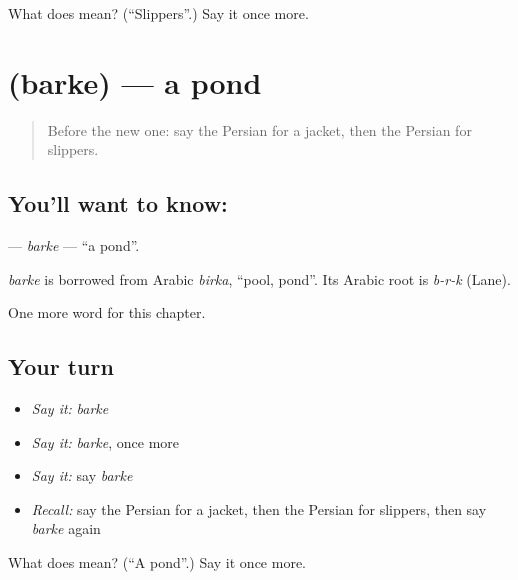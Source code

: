 \begin{tcolorbox}[breakable,colback=teal!4,colframe=teal!35!black,title={Before you move on}]
What does  mean? (\textquotedblleft{}Slippers\textquotedblright{}.) Say it once more.
\end{tcolorbox}
\section[\texorpdfstring{\fa{برکه} (barke)}{برکه (barke)}]{ (barke) — a pond}

\label{lesson:FA-C120-barke}



\begin{quote}
Before the new one: say the Persian for a jacket, then the Persian for slippers.
\end{quote}

\subsection*{You'll want to know: }
\textbf{} — \emph{barke} — \textquotedblleft{}a pond\textquotedblright{}.

\begin{cousinweb}
\emph{barke} is borrowed from Arabic \emph{birka}, \textquotedblleft{}pool, pond\textquotedblright{}. Its Arabic root is \emph{b-r-k} (Lane).
\end{cousinweb}

\begin{grammarlens}[title={What you've built}]
One more word for this chapter.
\end{grammarlens}

\subsection*{Your turn}
\begin{itemize}
\raggedright
  \item \emph{Say it:} \emph{barke}
  \item \emph{Say it:} \emph{barke}, once more
  \item \emph{Say it:} say \emph{barke}
  \item \emph{Recall:} say the Persian for a jacket, then the Persian for slippers, then say \emph{barke} again
\end{itemize}

\begin{tcolorbox}[breakable,colback=teal!4,colframe=teal!35!black,title={Before you move on}]
What does  mean? (\textquotedblleft{}A pond\textquotedblright{}.) Say it once more.
\end{tcolorbox}
